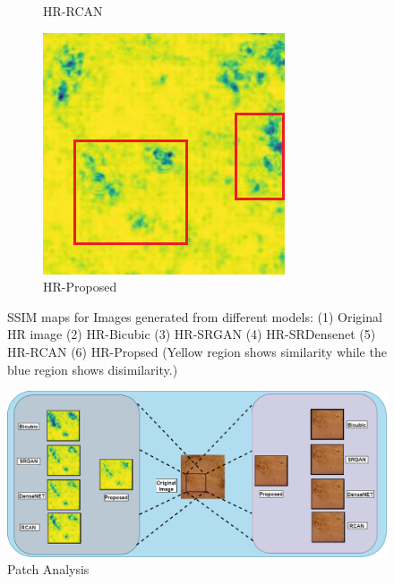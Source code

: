 \begin{figure}[H]
\begin{subfigure}[b]{0.275\textwidth}
    \caption{HR-RCAN}
  \end{subfigure}
  \begin{subfigure}[b]{0.275\textwidth}
    \includegraphics[width=\textwidth]{Chapter7/SSIM_proposed_9_marked.png}
    \caption{HR-Proposed}
  \end{subfigure}
    
    \caption[SSIM maps for images generated form different models.] {SSIM maps for Images generated from different models:
    (1) Original HR image (2) HR-Bicubic (3) HR-SRGAN (4) HR-SRDensenet (5) HR-RCAN (6) HR-Propsed (Yellow region shows similarity while the blue region shows disimilarity.)}
    \label{fig:label7.7}
\end{figure}


\begin{figure}[H]{\textwidth}
    \centering
    \includegraphics[width=\textwidth]{Chapter7/Patch Analysis.png}
    \caption[Patch Analysis]{Patch Analysis}
    \label{fig:label7.8}
\end{figure}



